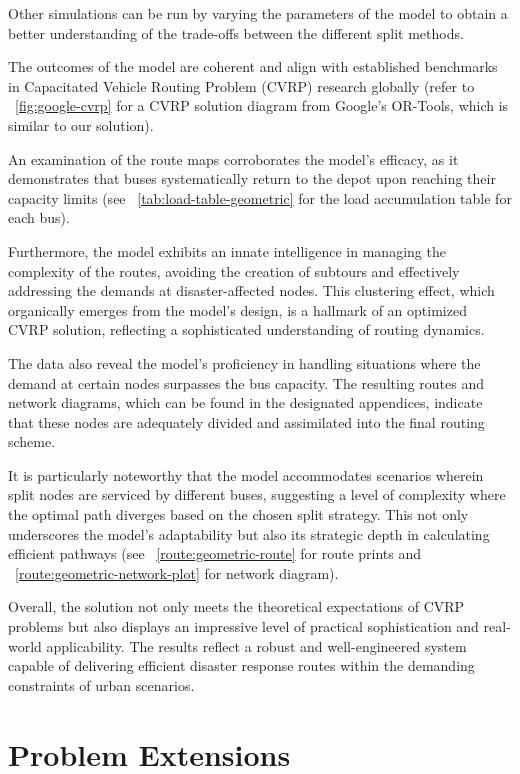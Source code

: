 \documentclass[12pt]{article}
\begin{document}
Other simulations can be run by varying the parameters of the model to obtain a better understanding of the trade-offs between the different split methods.

The outcomes of the model are coherent and align with established benchmarks in Capacitated Vehicle Routing Problem (CVRP) research globally (refer to ~\autoref{fig:google-cvrp} for a CVRP solution diagram from Google's OR-Tools, which is similar to our solution).

An examination of the route maps corroborates the model's efficacy, as it demonstrates that buses systematically return to the depot upon reaching their capacity limits (see ~\autoref{tab:load-table-geometric} for the load accumulation table for each bus).

Furthermore, the model exhibits an innate intelligence in managing the complexity of the routes, avoiding the creation of subtours and effectively addressing the demands at disaster-affected nodes. This clustering effect, which organically emerges from the model's design, is a hallmark of an optimized CVRP solution, reflecting a sophisticated understanding of routing dynamics.

The data also reveal the model's proficiency in handling situations where the demand at certain nodes surpasses the bus capacity. The resulting routes and network diagrams, which can be found in the designated appendices, indicate that these nodes are adequately divided and assimilated into the final routing scheme.

It is particularly noteworthy that the model accommodates scenarios wherein split nodes are serviced by different buses, suggesting a level of complexity where the optimal path diverges based on the chosen split strategy. This not only underscores the model's adaptability but also its strategic depth in calculating efficient pathways (see ~\autoref{route:geometric-route} for route prints and ~\autoref{route:geometric-network-plot} for network diagram).

Overall, the solution not only meets the theoretical expectations of CVRP problems but also displays an impressive level of practical sophistication and real-world applicability. The results reflect a robust and well-engineered system capable of delivering efficient disaster response routes within the demanding constraints of urban scenarios.


\newpage

\section{Problem Extensions}
\end{document}
